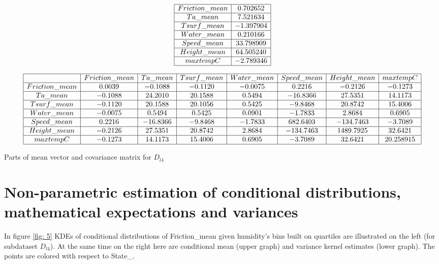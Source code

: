 \documentclass[12pt, bachelor, substylefile = algo_title.rtx]{disser}
\theoremstyle{definition}
\begin{document}
\begin{table}[h]
\tiny
$$
\begin{array}{|c|c|}
\hline
Friction\_mean &      0.702652\\
\hline
Ta\_mean          &   7.521634\\
\hline
Tsurf\_mean       &  -1.397904\\
\hline
Water\_mean       &   0.210166\\
\hline
Speed\_mean        & 33.798909\\
\hline
Height\_mean       & 64.505240\\
\hline
maxtempC          & -2.789346\\
\hline
\end{array}
$$

$$
\begin{array}{|c|c|c|c|c|c|c|c|}
\hline
 & Friction\_mean & Ta\_mean & Tsurf\_mean & Water\_mean & Speed\_mean  & Height\_mean & maxtempC\\
\hline
Friction\_mean & 0.0039 & -0.1088 & -0.1120 & -0.0075 &  0.2216 & -0.2126 & -0.1273\\
\hline
Ta\_mean & -0.1088 & 24.2010 & 20.1588 & 0.5494 & -16.8366 & 27.5351 & 14.1173\\
\hline
Tsurf\_mean & -0.1120 & 20.1588 & 20.1056& 0.5425& -9.8468 & 20.8742 & 15.4006\\
\hline
Water\_mean & -0.0075 & 0.5494 & 0.5425& 0.0901 & -1.7833 & 2.8684 & 0.6905\\
\hline
Speed\_mean  & 0.2216 & -16.8366 & -9.8468 & -1.7833 & 682.6403& -134.7463& -3.7089 \\ 
\hline
Height\_mean & -0.2126& 27.5351 & 20.8742 & 2.8684 &-134.7463 & 1489.7925 & 32.6421 \\
\hline
maxtempC & -0.1273 & 14.1173 & 15.4006 & 0.6905 & -3.7089 & 32.6421& 20.258915\\
\hline
\end{array}
$$

\caption{Parts of mean vector and covariance matrix for $D_{l4}$}
\label{tab: 2}
\end{table}


\section{Non-parametric estimation of conditional distributions, mathematical
expectations and variances}

In figure \ref{fig: 5} KDEs of conditional distributions of Friction\_mean given humidity's bins built on quartiles are illustrated on the left (for subdataset $D_{l4}$). At the same time on the right here are conditional mean (upper graph) and variance kernel estimates (lower graph). The points are colored with respect to State\_.
\end{document}
